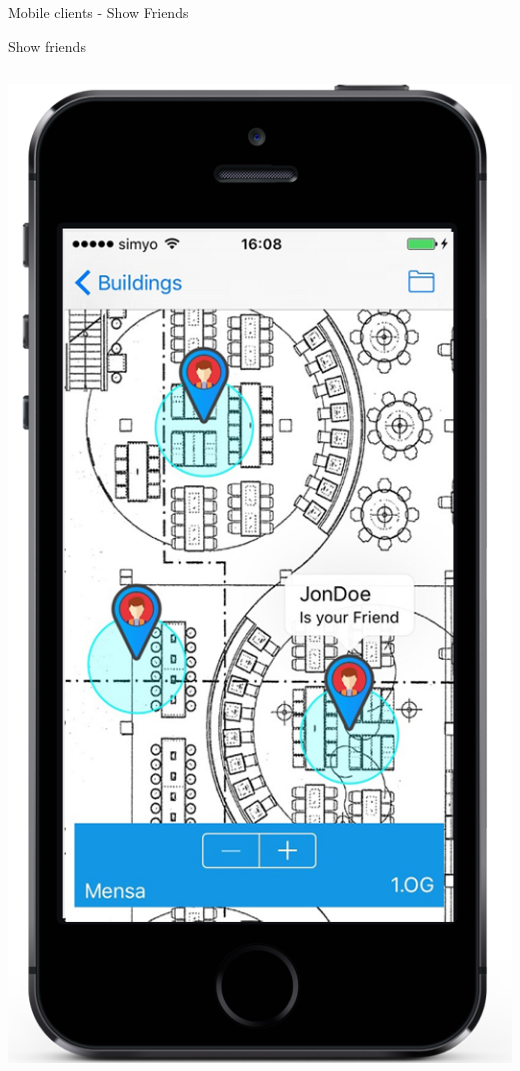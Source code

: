 \documentclass[11pt]{beamer}
\newcommand{\todo}[1]{\raisebox{0pt}{\parbox{0pt}{\begin{large}\colorbox{red}{todo: #1}\end{large} \hspace*{0.05cm}}}}
\begin{document}
\begin{frame}{Mobile clients - Show Friends}

  Show friends

  \begin{columns}[T]
	\begin{column}{.4\textwidth}
	\includegraphics[scale=0.27]{mappinpointc}
	\end{column}


\end{columns}
\end{frame}
\end{document}
